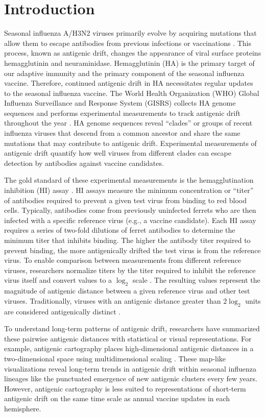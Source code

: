 \documentclass[utf8]{FrontiersinHarvard} %
\begin{document}
\section{Introduction}

Seasonal influenza A/H3N2 viruses primarily evolve by acquiring mutations that allow them to escape antibodies from previous infections or vaccinations \citep{Petrova2018}.
This process, known as antigenic drift, changes the appearance of viral surface proteins hemagglutinin and neuraminidase.
Hemagglutinin (HA) is the primary target of our adaptive immunity and the primary component of the seasonal influenza vaccine.
Therefore, continued antigenic drift in HA necessitates regular updates to the seasonal influenza vaccine.
The World Health Organization (WHO) Global Influenza Surveillance and Response System (GISRS) collects HA genome sequences and performs experimental measurements to track antigenic drift throughout the year \citep{Morris:2017ea}.
HA genome sequences reveal ``clades'' or groups of recent influenza viruses that descend from a common ancestor and share the same mutations that may contribute to antigenic drift.
Experimental measurements of antigenic drift quantify how well viruses from different clades can escape detection by antibodies against vaccine candidates.

The gold standard of these experimental measurements is the hemagglutination inhibition (HI) assay \citep{hirst1943studies}.
HI assays measure the minimum concentration or ``titer'' of antibodies required to prevent a given test virus from binding to red blood cells.
Typically, antibodies come from previously uninfected ferrets who are then infected with a specific reference virus (e.g., a vaccine candidate).
Each HI assay requires a series of two-fold dilutions of ferret antibodies to determine the minimum titer that inhibits binding.
The higher the antibody titer required to prevent binding, the more antigenically drifted the test virus is from the reference virus.
To enable comparison between measurements from different reference viruses, researchers normalize titers by the titer required to inhibit the reference virus itself and convert values to a $\log_{2}$ scale \citep{Neher:2016hy}.
The resulting values represent the magnitude of antigenic distance between a given reference virus and other test viruses.
Traditionally, viruses with an antigenic distance greater than $2\log_{2}$ units are considered antigenically distinct \citep{Katz2011}.

To understand long-term patterns of antigenic drift, researchers have summarized these pairwise antigenic distances with statistical or visual representations.
For example, antigenic cartography places high-dimensional antigenic distances in a two-dimensional space using multidimensional scaling \citep{Smith:2004jc,Bedford:2014bf}.
These map-like visualizations reveal long-term trends in antigenic drift within seasonal influenza lineages like the punctuated emergence of new antigenic clusters every few years.
However, antigenic cartography is less suited to representations of short-term antigenic drift on the same time scale as annual vaccine updates in each hemisphere.
\end{document}
